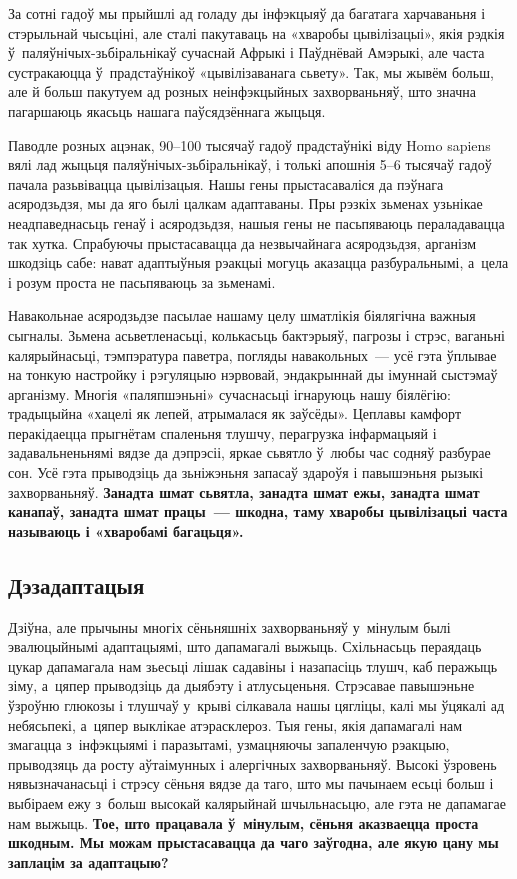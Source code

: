 За сотні гадоў мы прыйшлі ад голаду ды інфэкцыяў да багатага харчаваньня і стэрыльнай чысьціні, але сталі пакутаваць на «хваробы цывілізацыі», якія рэдкія ў~паляўнічых-зьбіральнікаў сучаснай Афрыкі і Паўднёвай Амэрыкі, але часта сустракаюцца ў~прадстаўнікоў «цывілізаванага сьвету». Так, мы жывём больш, але й больш пакутуем ад розных неінфэкцыйных захворваньняў, што значна пагаршаюць якасьць нашага паўсядзённага жыцьця.

Паводле розных ацэнак, 90--100 тысячаў гадоў прадстаўнікі віду Homo sapiens вялі лад жыцьця паляўнічых-зьбіральнікаў, і толькі апошнія 5--6 тысячаў гадоў пачала разьвівацца цывілізацыя. Нашы гены прыстасаваліся да пэўнага асяродзьдзя, мы да яго былі цалкам адаптаваны. Пры рэзкіх зьменах узьнікае неадпаведнасьць генаў і асяродзьдзя, нашыя гены не пасьпяваюць пераладавацца так хутка. Спрабуючы прыстасавацца да незвычайнага асяродзьдзя, арганізм шкодзіць сабе: нават адаптыўныя рэакцыі могуць аказацца разбуральнымі, а~цела і розум проста не пасьпяваюць за зьменамі.

Навакольнае асяродзьдзе пасылае нашаму целу шматлікія біялягічна важныя сыгналы. Зьмена асьветленасьці, колькасьць бактэрыяў, пагрозы і стрэс, ваганьні калярыйнасьці, тэмпэратура паветра, погляды навакольных~--- усё гэта ўплывае на тонкую настройку і рэгуляцыю нэрвовай, эндакрыннай ды імуннай сыстэмаў арганізму. Многія «паляпшэньні» сучаснасьці ігнаруюць нашу біялёгію: традыцыйна «хацелі як лепей, атрымалася як заўсёды». Цеплавы камфорт перакідаецца прыгнётам спаленьня тлушчу, перагрузка інфармацыяй і задавальненьнямі вядзе да дэпрэсіі, яркае сьвятло ў~любы час содняў разбурае сон. Усё гэта прыводзіць да зьніжэньня запасаў здароўя і павышэньня рызыкі захворваньняў. \textbf{Занадта шмат сьвятла, занадта шмат ежы, занадта шмат канапаў, занадта шмат працы~--- шкодна, таму хваробы цывілізацыі часта называюць і «хваробамі багацьця».}

\subsection*{Дэзадаптацыя}

Дзіўна, але прычыны многіх сёньняшніх захворваньняў у~мінулым былі эвалюцыйнымі адаптацыямі, што дапамагалі выжыць. Схільнасьць пераядаць цукар дапамагала нам зьесьці лішак садавіны і назапасіць тлушч, каб перажыць зіму, а~цяпер прыводзіць да дыябэту і атлусьценьня. Стрэсавае павышэньне ўзроўню глюкозы і тлушчаў у~крыві сілкавала нашы цягліцы, калі мы ўцякалі ад небясьпекі, а~цяпер выклікае атэрасклероз. Тыя гены, якія дапамагалі нам змагацца з~інфэкцыямі і паразытамі, узмацняючы запаленчую рэакцыю, прыводзяць да росту аўтаімунных і алергічных захворваньняў. Высокі ўзровень нявызначанасьці і стрэсу сёньня вядзе да таго, што мы пачынаем есьці больш і выбіраем ежу з~больш высокай калярыйнай шчыльнасьцю, але гэта не дапамагае нам выжыць. \textbf{Тое, што працавала ў~мінулым, сёньня аказваецца проста шкодным. Мы можам прыстасавацца да чаго заўгодна, але якую цану мы заплацім за адаптацыю?}

